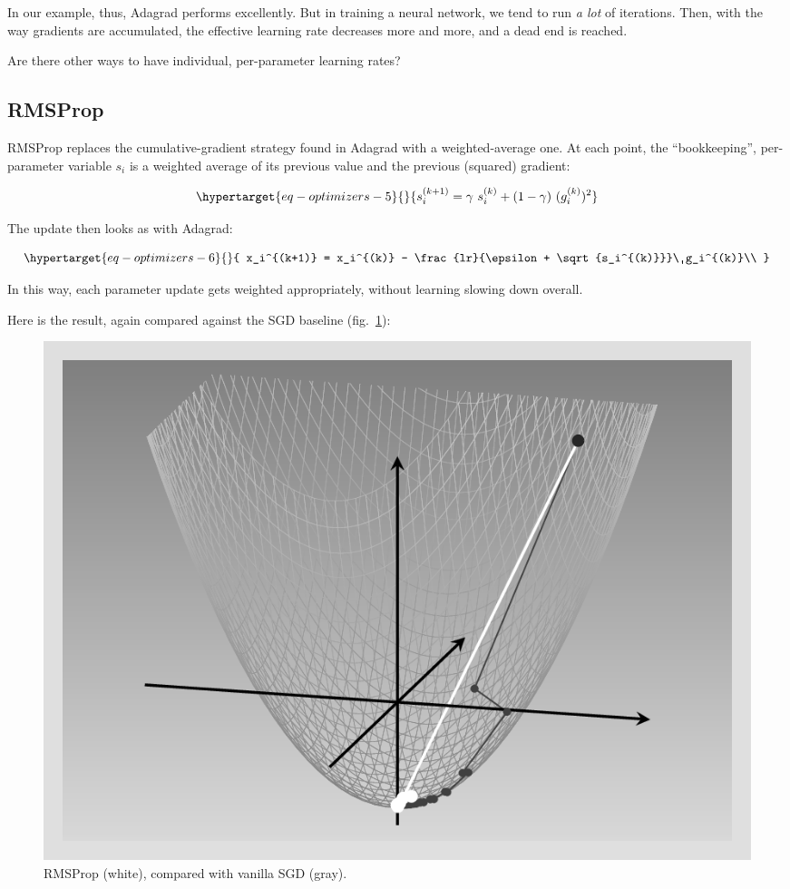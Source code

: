 \documentclass[
  letterpaper,
]{krantz}
\begin{document}
In our example, thus, Adagrad performs excellently. But in training a
neural network, we tend to run \emph{a lot} of iterations. Then, with
the way gradients are accumulated, the effective learning rate decreases
more and more, and a dead end is reached.

Are there other ways to have individual, per-parameter learning rates?

\hypertarget{rmsprop}{%
\subsection{\texorpdfstring{RMSProp}{RMSProp}}\label{rmsprop}}

RMSProp replaces the cumulative-gradient strategy found in Adagrad with
a weighted-average one. At each point, the ``bookkeeping'',
per-parameter variable \(s_i\) is a weighted average of its previous
value and the previous (squared) gradient:

\begin{equation}\protect\hypertarget{eq-optimizers-5}{}{
s_i^{(k+1)} = \gamma \ s_i^{(k)} + (1-\gamma) \ (g_i^{(k)})^2
}\label{eq-optimizers-5}\end{equation}

The update then looks as with Adagrad:

\begin{equation}\protect\hypertarget{eq-optimizers-6}{}{
x_i^{(k+1)} = x_i^{(k)} - \frac{lr}{\epsilon + \sqrt{s_i^{(k)}}}\ g_i^{(k)}\\
}\label{eq-optimizers-6}\end{equation}

In this way, each parameter update gets weighted appropriately, without
learning slowing down overall.

Here is the result, again compared against the SGD baseline
(fig.~\ref{fig-optimizers-rmsprop}):

\begin{figure}[H]

{\centering \includegraphics{images/optimizers-rmsprop.png}

}

\caption{\label{fig-optimizers-rmsprop}RMSProp (white), compared with
vanilla SGD (gray).}

\end{figure}
\end{document}
